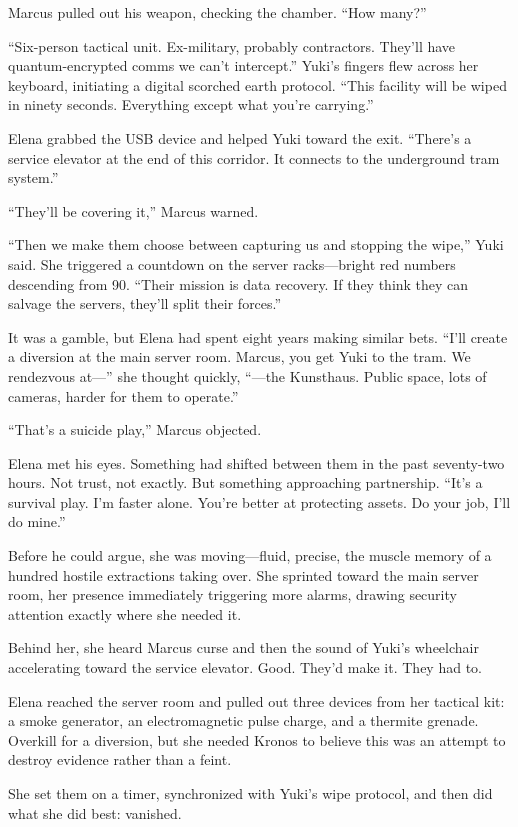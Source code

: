 Marcus pulled out his weapon, checking the chamber. ``How many?''

``Six-person tactical unit. Ex-military, probably contractors. They'll have quantum-encrypted comms we can't intercept.'' Yuki's fingers flew across her keyboard, initiating a digital scorched earth protocol. ``This facility will be wiped in ninety seconds. Everything except what you're carrying.''

Elena grabbed the USB device and helped Yuki toward the exit. ``There's a service elevator at the end of this corridor. It connects to the underground tram system.''

``They'll be covering it,'' Marcus warned.

``Then we make them choose between capturing us and stopping the wipe,'' Yuki said. She triggered a countdown on the server racks---bright red numbers descending from 90. ``Their mission is data recovery. If they think they can salvage the servers, they'll split their forces.''

It was a gamble, but Elena had spent eight years making similar bets. ``I'll create a diversion at the main server room. Marcus, you get Yuki to the tram. We rendezvous at---'' she thought quickly, ``---the Kunsthaus. Public space, lots of cameras, harder for them to operate.''

``That's a suicide play,'' Marcus objected.

Elena met his eyes. Something had shifted between them in the past seventy-two hours. Not trust, not exactly. But something approaching partnership. ``It's a survival play. I'm faster alone. You're better at protecting assets. Do your job, I'll do mine.''

Before he could argue, she was moving---fluid, precise, the muscle memory of a hundred hostile extractions taking over. She sprinted toward the main server room, her presence immediately triggering more alarms, drawing security attention exactly where she needed it.

Behind her, she heard Marcus curse and then the sound of Yuki's wheelchair accelerating toward the service elevator. Good. They'd make it. They had to.

Elena reached the server room and pulled out three devices from her tactical kit: a smoke generator, an electromagnetic pulse charge, and a thermite grenade. Overkill for a diversion, but she needed Kronos to believe this was an attempt to destroy evidence rather than a feint.

She set them on a timer, synchronized with Yuki's wipe protocol, and then did what she did best: vanished.


